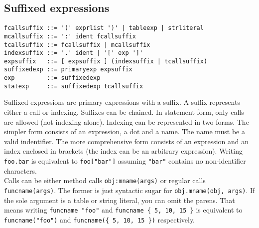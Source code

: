 \documentclass{article}
\begin{document}
\subsection{Suffixed expressions}
\begin{lstlisting}[language=bnf]
fcallsuffix ::= '(' exprlist ')' | tableexp | strliteral
mcallsuffix ::= ':' ident fcallsuffix
tcallsuffix ::= fcallsuffix | mcallsuffix
indexsuffix ::= '.' ident | '[' exp ']'
expsuffix   ::= [ expsuffix ] (indexsuffix | tcallsuffix)
suffixedexp ::= primaryexp expsuffix
exp         ::= suffixedexp
statexp     ::= suffixedexp tcallsuffix
\end{lstlisting}
Suffixed expressions are primary expressions with a suffix. A suffix
represents either a call or indexing. Suffixes can be chained. In statement
form, only calls are allowed (not indexing alone). Indexing can be represented
in two forms. The simpler form consists of an expression, a dot and a name.
The name must be a valid indentifier. The more comprehensive form consists
of an expression and an index enclosed in brackets (the index can be an
arbitrary expression). Writing \verb|foo.bar| is equivalent to
\verb|foo["bar"]| assuming \verb|"bar"| contains no non-identifier
characters.\\
Calls can be either method calls \verb|obj:mname(args)| or regular
calls \verb|funcname(args)|. The former is just syntactic sugar for
\verb|obj.mname(obj, args)|. If the sole argument is a table or string literal,
you can omit the parens. That means writing \verb|funcname "foo"| and
\verb|funcname { 5, 10, 15 }| is equivalent to \verb|funcname("foo")| and
\verb|funcname({ 5, 10, 15 })| respectively.
\end{document}

